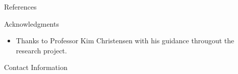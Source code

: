 \documentclass[final,hyperref={pdfpagelabels=false}]{beamer}
\begin{document}
\begin{frame}[t]
\begin{column}{.465\textwidth}
\begin{block}{References}
        
\nocite{*} %
\small{
}

\end{block}
        

 
  
 



\begin{block}{Acknowledgments}

\begin{itemize}
\item Thanks to Professor Kim Christensen with his guidance througout the research project. 
\end{itemize}

\end{block}



\begin{block}{Contact Information}


\end{block}
\end{column}
\end{frame}
\end{document}
